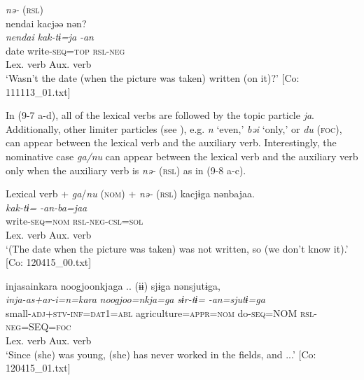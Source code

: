 \ex \textit{nə-} (\textsc{rsl}) \label{ex:9.7d}\\
    \gllll    {\textbar}nendai{\textbar}  kacjəə  nən?\\
      \textit{nendai}  \textit{kak-tɨ=ja}  \textit{-an}\\
      date  write-\textsc{seq}=\textsc{top}  \textsc{rsl}-\textsc{neg}\\
      {}  {Lex. verb}  {Aux. verb}\\
      \glt       ‘Wasn’t the date (when the picture was taken) written (on it)?’ [Co: 111113\_01.txt]
    \z
\z

In (9-7 a-d), all of the lexical verbs are followed by the topic particle \textit{ja}. Additionally, other limiter particles (see ), e.g. \textit{n} ‘even,’ \textit{bəi} ‘only,’ or \textit{du} (\textsc{foc}), can appear between the lexical verb and the auxiliary verb. Interestingly, the nominative case \textit{ga/nu} can appear between the lexical verb and the auxiliary verb only when the auxiliary verb is \textit{nə-} (\textsc{rsl}) as in (9-8 a-c).

\ea   Lexical verb + \textit{ga}/\textit{nu} (\textsc{nom}) + \textit{nə-} (\textsc{rsl}) \label{ex:9.8}
\ea %
 \gllll  kacjɨga  nənbajaa.\\
      \textit{kak-tɨ=}  \textit{-an-ba=jaa}\\
      write-\textsc{seq}=\textsc{nom}  \textsc{rsl}-\textsc{neg}-\textsc{csl}=\textsc{sol}\\
      {Lex. verb}  {Aux. verb}\\
      \glt       ‘(The date when the picture was taken) was not written, so (we don’t know it).’ [Co: 120415\_00.txt]

\ex \label{ex:9.8b} %
    \gllll  injasainkara  noogjoonkjaga ..  (ɨɨ)                   sjɨga  nənsjutɨga,\\
      \textit{inja-as+ar-i=n=kara}  \textit{noogjoo=nkja=ga}     {}       \textit{sɨr-tɨ=}  \textit{-an=sjutɨ=ga}\\
      small-\textsc{adj}+\textsc{stv}-\textsc{inf}=\textsc{dat}1=\textsc{abl}  agriculture=\textsc{appr}=\textsc{nom}    {}             do-\textsc{seq}=NOM  \textsc{rsl}-\textsc{neg}=SEQ=\textsc{foc}\\
           {} {} {}             {Lex. verb}  {Aux. verb}\\
      \glt       ‘Since (she) was young, (she) has never worked in the fields, and ...’ [Co: 120415\_01.txt]

